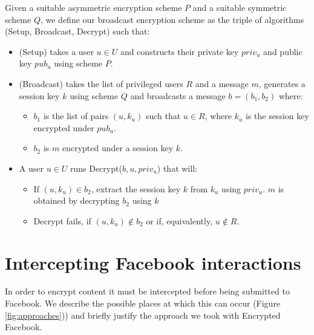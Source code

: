 \begin{defn}
    
    Given a suitable asymmetric encryption scheme $P$ and a suitable symmetric scheme $Q$, we define our broadcast encryption scheme as the triple of algorithms {\sc (Setup, Broadcast, Decrypt)} such that:
    
    \begin{itemize}
    
    \item {\sc (Setup)} takes a user $u \in U$ and constructs their private key $priv_u$ and public key $pub_u$ using scheme $P$.
    
    \item {\sc (Broadcast)} takes the list of privileged users $R$ and a message $m$, generates a session key $k$ using scheme $Q$ and broadcasts a message $b = (b_1,b_2)$ where:
    
    \begin{itemize}
        \item $b_1$ is the list of pairs $(u,k_u)$ such that $u \in R$, where $k_u$ is the session key encrypted under $pub_u$.
        \item $b_2$ is $m$ encrypted under a session key $k$.
    \end{itemize}
    
    
    \item A user $u \in U$ runs {\sc Decrypt($b, u, priv_u$)} that will:
    
        \begin{itemize}
            \item If $(u,k_u) \in b_2$, extract the session key $k$ from $k_u$ using $priv_u$. $m$ is obtained by decrypting $b_2$ using $k$
        
            \item {\sc Decrypt} fails, if $(u,k_u) \notin b_2$ or if, equivalently, $u \notin R$.
        
        \end{itemize}

    \end{itemize}
    

\end{defn}    


\FloatBarrier
\section{Intercepting Facebook interactions}

In order to encrypt content it must be intercepted before being submitted to Facebook. We describe the possible places at which this can occur (Figure \ref{fig:approaches})) and briefly justify the approach we took with Encrypted Facebook.

